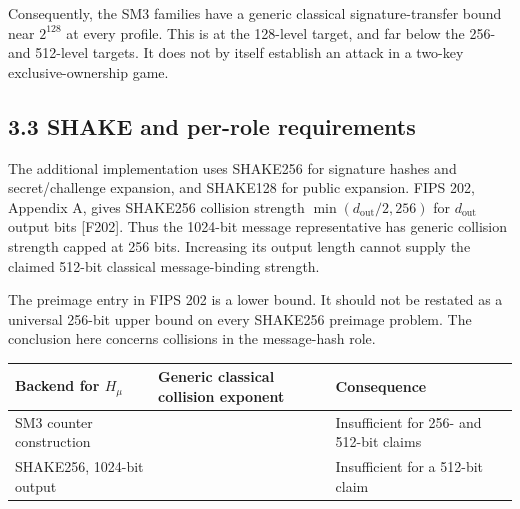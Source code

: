 \documentclass[
  american,
  10pt,
  a4paper,
]{article}
\newcounter{none} %
\begin{document}
Consequently, the SM3 families have a generic classical
signature-transfer bound near \(2^{128}\) at every profile. This is at
the 128-level target, and far below the 256- and 512-level targets. It
does not by itself establish an attack in a two-key exclusive-ownership
game.

\subsection{3.3 SHAKE and per-role
requirements}\label{shake-and-per-role-requirements}

The additional implementation uses SHAKE256 for signature hashes and
secret/challenge expansion, and SHAKE128 for public expansion. FIPS 202,
Appendix A, gives SHAKE256 collision strength
\(\min(d_{\mathrm{out}}/2,256)\) for \(d_{\mathrm{out}}\) output bits
{[}F202{]}. Thus the 1024-bit message representative has generic
collision strength capped at 256 bits. Increasing its output length
cannot supply the claimed 512-bit classical message-binding strength.

The preimage entry in FIPS 202 is a lower bound. It should not be
restated as a universal 256-bit upper bound on every SHAKE256 preimage
problem. The conclusion here concerns collisions in the message-hash
role.

{\def\LTcaptype{none} %
\begin{longtable}[]{@{}
  >{\raggedright\arraybackslash}p{}
  >{\raggedleft\arraybackslash}p{}
  >{\raggedright\arraybackslash}p{}@{}}
\toprule\noalign{}
\begin{minipage}[b]{\linewidth}\raggedright
Backend for \(H_\mu\)
\end{minipage} & \begin{minipage}[b]{\linewidth}\raggedleft
Generic classical collision exponent
\end{minipage} & \begin{minipage}[b]{\linewidth}\raggedright
Consequence
\end{minipage} \\
\midrule\noalign{}
\endhead
\bottomrule\noalign{}
\endlastfoot
SM3 counter construction & 128 & Insufficient for 256- and 512-bit
claims \\
SHAKE256, 1024-bit output & 256 & Insufficient for a 512-bit claim \\
\end{longtable}
}
\end{document}
